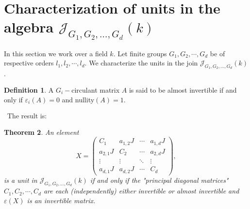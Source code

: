 \documentclass[12pt, a4paper]{amsart}
\numberwithin{equation}{section} %
\theoremstyle{plain}
\newtheorem{thm}{Theorem}[section]
\theoremstyle{definition}
\newtheorem{defn}[thm]{Definition}
\theoremstyle{plain}
\theoremstyle{remark}
\newcommand{\ones}{J}
\begin{document}
%
%
%
%
%
\section{Characterization of units in the algebra $\mathcal{J}_{G_1, G_2, \ldots, G_d}(k)$}

\bigskip

In this section we work over a field $k$. Let finite groups $G_{1},G_{2},\cdots ,G_{d}$ be of
respective orders $l_{1},l_{2},\cdots ,l_{d}$. We characterize the units in
the join $\mathcal{J}_{G_1, G_2, \ldots, G_d}(k)$.\ \ 
\begin{defn}  A $G_i-$circulant matrix $A$ is said to be almost invertible if and only if $\varepsilon_i(A)=0$ and nullity$(A)=1$.   \end{defn}   \ The result is:

\bigskip

\begin{thm} \label{unitstheorem}
An element \begin{equation}\label{eq:join circulant matrix}\tag{$\ast$}
X=\left(\begin{array}{c|c|c|c}
C_1 & a_{1,2}\ones & \cdots & a_{1,d}\ones \\
\hline
a_{2,1}\ones & C_2 & \cdots & a_{2,d}\ones \\
\hline
\vdots & \vdots & \ddots & \vdots \\
\hline
a_{d,1}\ones & a_{d,2}\ones & \cdots & C_d
\end{array}\right),
\end{equation} is a unit in $\mathcal{J}_{G_1, G_2, \ldots, G_d}(k)$ if and only if the "principal diagonal matrices" $C_1,C_2,\cdots,C_d$ are each (independently) either
invertible or almost invertible and $\varepsilon(X)$ is an invertible matrix.
\end{thm}
\end{document}
